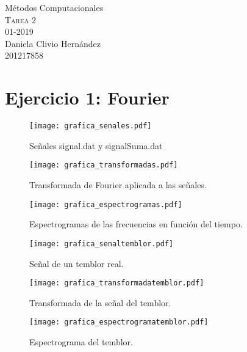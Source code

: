 \documentclass[11pt,letterpaper]{exam}
\begin{document}
\begin{center}
{\Large Métodos Computacionales} \\
\textsc{Tarea 2}\\
01-2019\\
Daniela Clivio Hernández\\
201217858\\
\end{center}

\noindent
\section{Ejercicio 1: Fourier}
\begin{figure}[H]
\centering
\texttt{[image: grafica\_senales.pdf]}
\caption{Señales signal.dat y signalSuma.dat}
\label{fig1}
\end{figure}

\begin{figure}[H]
\centering
\texttt{[image: grafica\_transformadas.pdf]}
\caption{Transformada de Fourier aplicada a las señales.}
\label{fig2}
\end{figure}

\begin{figure}[H]
\centering
\texttt{[image: grafica\_espectrogramas.pdf]}
\caption{Espectrogramas de las frecuencias en función del tiempo.}
\label{fig3}
\end{figure}

\begin{figure}[H]
\centering
\texttt{[image: grafica\_senaltemblor.pdf]}
\caption{Señal de un temblor real.}
\label{fig4}
\end{figure}

\begin{figure}[H]
\centering
\texttt{[image: grafica\_transformadatemblor.pdf]}
\caption{Transformada de la señal del temblor.}
\label{fig5}
\end{figure}

\begin{figure}[H]
\centering
\texttt{[image: grafica\_espectrogramatemblor.pdf]}
\caption{Espectrograma del temblor.}
\label{fig6}
\end{figure}

\end{document}
